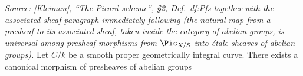 \begin{theorem}
  \label{thm:rel_pic_etale_sheaf_unit_canonical}

  \textit{Source: [Kleiman], ``The Picard scheme'', \S 2,
  Def.~df:Pfs together with the associated-sheaf paragraph
  immediately following (the natural map from a presheaf to its
  associated sheaf, taken inside the category of abelian groups, is
  universal among presheaf morphisms from \(\Pic_{X/S}\) into \'etale
  sheaves of abelian groups).}
  Let \(C/k\) be a smooth proper geometrically integral curve. There
  exists a canonical morphism of presheaves of abelian groups

\end{theorem}
